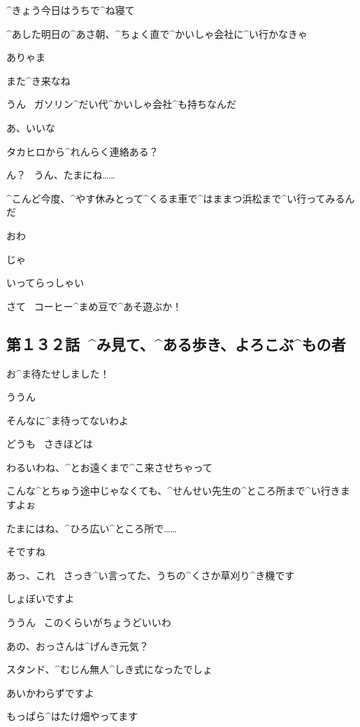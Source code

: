 \page[12]
\Makki ^{きょう}{今日}はうちで^{ね}{寝}て

\Makki ^{あした}{明日}の^{あさ}{朝}、^{ちょく}{直}で^{かいしゃ}{会社}に^{い}{行}かなきゃ

\Alpha ありゃま

\Alpha また^{き}{来}なね

\Makki うん
\ ガソリン^{だい}{代}^{かいしゃ}{会社}^{も}{持}ちなんだ

\Alpha あ、いいな

\page
\Alpha タカヒロから^{れんらく}{連絡}ある？

\Makki ん？
\ うん、たまにね……

\Makki ^{こんど}{今度}、^{やす}{休}みとって^{くるま}{車}で^{はままつ}{浜松}まで^{い}{行}ってみるんだ

\Alpha おわ

\page
\Makki じゃ

\Alpha いってらっしゃい

\page
\Alpha さて
\ コーヒー^{まめ}{豆}で^{あそ}{遊}ぶか！


\subsection{第１３２話\ ^{み}{見}て、^{ある}{歩}き、よろこぶ^{もの}{者}}

\page[20]
\Alpha お^{ま}{待}たせしました！

\Sensei ううん

\Sensei そんなに^{ま}{待}ってないわよ

\Alpha どうも
\ さきほどは

\Sensei わるいわね、^{とお}{遠}くまで^{こ}{来}させちゃって

\Alpha こんな^{とちゅう}{途中}じゃなくても、^{せんせい}{先生}の^{ところ}{所}まで^{い}{行}きますよぉ

\Sensei たまにはね、^{ひろ}{広}い^{ところ}{所}で……

\page
\Alpha そですね

\Alpha あっ、これ
\ さっき^{い}{言}ってた、うちの^{くさか}{草刈}り^{き}{機}です

\Alpha しょぼいですよ

\Sensei ううん
\ このくらいがちょうどいいわ

\page
\Sensei あの、おっさんは^{げんき}{元気}？

\Sensei スタンド、^{むじん}{無人}^{しき}{式}になったでしょ

\Alpha あいかわらずですよ

\Alpha もっぱら^{はたけ}{畑}やってます

